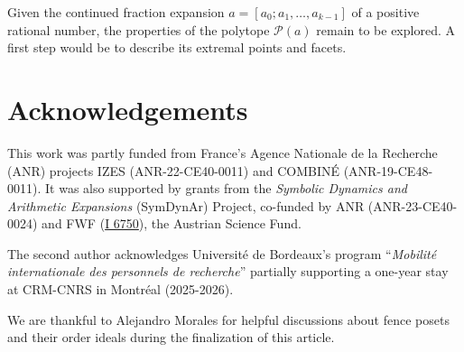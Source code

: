 \documentclass[a4paper,12pt]{amsart}
\newcommand{\Pcal}{{\mathcal{P}}}
\newcommand{\0}{\mathtt{0}}
\newcommand{\1}{\mathtt{1}}
\newcommand{\2}{\mathtt{2}}
\newcommand{\3}{\mathtt{3}}
\begin{document}
Given the continued fraction expansion $a=[a_0; a_1, \dots, a_{k-1}]$
of a positive rational number,
the properties of the polytope $\Pcal(a)$ remain to be explored.
A first step would be to
describe its extremal points and facets.

%
%
%
%
%
%
%





\section*{Acknowledgements}
This work was partly funded from France's Agence Nationale de la Recherche
(ANR) projects IZES (ANR-22-CE40-0011) and COMBINÉ (ANR-19-CE48-0011).
It was also supported by grants from the
\emph{Symbolic Dynamics and Arithmetic Expansions}
(SymDynAr) Project, co-funded by ANR (ANR-23-CE40-0024)
and FWF (\href{https://dx.doi.org/10.55776/I6750}{I 6750}),
the Austrian Science Fund.

The second author acknowledges Université de Bordeaux's program
``\textit{Mobilité internationale des personnels de recherche}''
partially supporting a one-year stay at CRM-CNRS in Montréal (2025-2026).

We are thankful to Alejandro Morales for helpful discussions about fence posets
and their order ideals during the finalization of this article.

%
%
%
%
%


\end{document}
